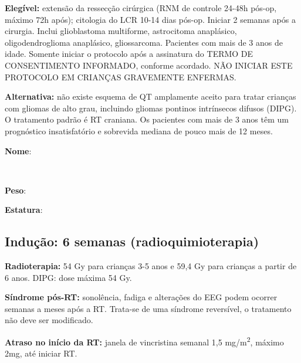 \documentclass[11pt,a4paper,oldfontcommands]{memoir}
\def\entrywithlabel[#1]#2{\parbox{#1}{{\small #2:} \hrulefill}}
\begin{document}
\textbf{Elegível:} extensão da ressecção cirúrgica (RNM de controle 24-48h pós-op, máximo 72h após); citologia do LCR 10-14 dias pós-op. Iniciar 2 semanas após a cirurgia. Inclui glioblastoma multiforme, astrocitoma anaplásico, oligodendroglioma anaplásico, gliossarcoma. Pacientes com mais de 3 anos de idade. Somente iniciar o protocolo após a assinatura do TERMO DE CONSENTIMENTO INFORMADO, conforme acordado. NÃO INICIAR ESTE PROTOCOLO EM CRIANÇAS GRAVEMENTE ENFERMAS.

\textbf{Alternativa:} não existe esquema de QT amplamente aceito para tratar crianças com gliomas de alto grau, incluindo gliomas pontinos intrínsecos difusos (DIPG). O tratamento padrão é RT craniana. Os pacientes com mais de 3 anos têm um prognóstico insatisfatório e sobrevida mediana de pouco mais de 12 meses.
\\[0.4cm]
\entrywithlabel[1\hsize]{\textbf{Nome}}\hfill
\\[0.3cm]
\entrywithlabel[.45\hsize]{\textbf{Peso}}\hfill  \entrywithlabel[.45\hsize]{\textbf{Estatura}}

\subsection{Indução: 6 semanas (radioquimioterapia)}
\textbf{Radioterapia:} 54 Gy para crianças 3-5 anos e 59,4 Gy para crianças a partir de 6 anos. DIPG: dose máxima 54 Gy.

\textbf{Síndrome pós-RT:} sonolência, fadiga e alterações do EEG podem ocorrer semanas a meses após a RT. Trata-se de uma síndrome reversível, o tratamento não deve ser modificado.

\textbf{Atraso no início da RT:} janela de vincristina semanal 1,5 mg/m\textsuperscript{2}, máximo 2mg, até iniciar RT.

\renewcommand{\arraystretch}{1.5}
\end{document}
